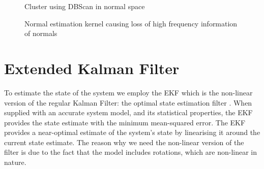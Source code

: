 \documentclass[]{article}
\begin{document}
{\begin{figure}[p]
	\caption{Cluster using DBScan in normal space}
	\label{fig:box_normal_clustering}
\end{figure}



\begin{figure}[p]
	\centering     %
	\;

	\caption{Normal estimation kernel causing loss of high frequency information of normals}
	\label{fig:spurious_plane_normals}
\end{figure}
\clearpage


\clearpage %
\section{Extended Kalman Filter} %
\label{sec:ekf}

To estimate the state of the system we employ the EKF which is the non-linear version of the regular Kalman Filter: the optimal state estimation filter \cite{todo}. When supplied with an accurate system model, and its statistical properties, the EKF provides the state estimate with the minimum mean-squared error.
The EKF provides a near-optimal estimate of the system's state by linearising it around the current state estimate. The reason why we need the non-linear version of the filter is due to the fact that the model includes rotations, which are non-linear in nature.

}
\end{document}
